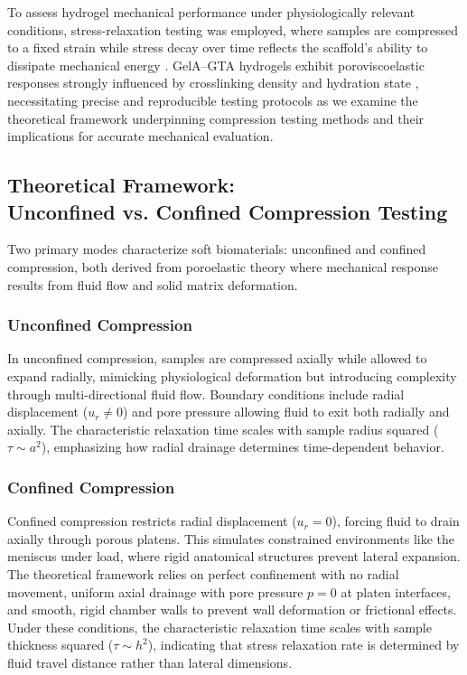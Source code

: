 To assess hydrogel mechanical performance under physiologically relevant conditions, stress-relaxation testing was employed, where samples are compressed to a fixed strain while stress decay over time reflects the scaffold's ability to dissipate mechanical energy \cite{watasestressrelaxation, makris2011kneemeniscus}. GelA--GTA hydrogels exhibit poroviscoelastic responses strongly influenced by crosslinking density and hydration state \cite{chaudhuri2016hydrogelstunable, morejon2020compressiveproperties}, necessitating precise and reproducible testing protocols as we examine the theoretical framework underpinning compression testing methods and their implications for accurate mechanical evaluation.

\clearpage
\subsection{Theoretical Framework: \protect\\ Unconfined vs. Confined Compression Testing}

Two primary modes characterize soft biomaterials: unconfined and confined compression, both derived from poroelastic theory where mechanical response results from fluid flow and solid matrix deformation.

\subsubsection{Unconfined Compression}

In unconfined compression, samples are compressed axially while allowed to expand radially, mimicking physiological deformation but introducing complexity through multi-directional fluid flow. Boundary conditions include radial displacement ($u_r \neq 0$) and pore pressure allowing fluid to exit both radially and axially. The characteristic relaxation time scales with sample radius squared ($\tau \sim a^2$), emphasizing how radial drainage determines time-dependent behavior.

\subsubsection{Confined Compression}

Confined compression restricts radial displacement ($u_r = 0$), forcing fluid to drain axially through porous platens. This simulates constrained environments like the meniscus under load, where rigid anatomical structures prevent lateral expansion. The theoretical framework relies on perfect confinement with no radial movement, uniform axial drainage with pore pressure $p = 0$ at platen interfaces, and smooth, rigid chamber walls to prevent wall deformation or frictional effects. Under these conditions, the characteristic relaxation time scales with sample thickness squared ($\tau \sim h^2$), indicating that stress relaxation rate is determined by fluid travel distance rather than lateral dimensions.

